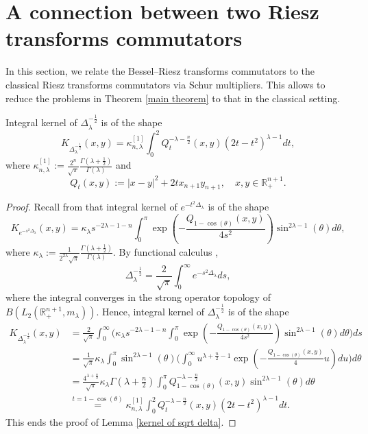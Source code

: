 \documentclass[12pt]{amsart}
\begin{document}
\section{A connection between two Riesz transforms commutators}\label{Sec3}
In this section, we relate the Bessel--Riesz transforms commutators to the classical Riesz transforms commutators via Schur multipliers. This allows to reduce the problems in Theorem \ref{main theorem} to that in the classical setting.
\begin{lemma}\label{kernel of sqrt delta} Integral kernel of $\Delta_{\lambda}^{-\frac12}$ is of the shape
$$K_{\Delta_{\lambda}^{-\frac12}}(x,y)=\kappa_{n,\lambda}^{[1]}\int_0^2Q_t^{-\lambda-\frac{n}{2}}(x,y)(2t-t^2)^{\lambda-1}dt,$$
where $\kappa_{n,\lambda}^{[1]}:=\frac{2^n}{\sqrt{\pi}}\frac{\Gamma(\lambda+\frac{1}{2})}{\Gamma(\lambda)}$ and
$$Q_t(x,y):=|x-y|^2+2tx_{n+1}y_{n+1},\quad x,y\in\mathbb{R}^{n+1}_+.$$
\end{lemma}
\begin{proof} Recall from \cite[formula (2.11)]{FLLXarxiv} that integral kernel of $e^{-t^2\Delta_{\lambda}}$ is of the shape
$$K_{e^{-s^2\Delta_{\lambda}}}(x,y)=\kappa_{\lambda}s^{-2\lambda-1-n}\int_0^{\pi}\exp(-\frac{Q_{1-\cos(\theta)}(x,y)}{4s^2})\sin^{2\lambda-1}(\theta)d\theta,$$
where $\kappa_\lambda:=\frac{1}{2^{2\lambda}\sqrt{\pi}}\frac{\Gamma(\lambda+\frac{1}{2})}{\Gamma(\lambda)}$. By functional calculus \cite{MR1336382},
$$\Delta_{\lambda}^{-\frac12}=\frac{2}{\sqrt{\pi}}\int_0^{\infty}e^{-s^2\Delta_{\lambda}}ds,$$
where the integral converges in the strong operator topology of $B(L_2(\mathbb{R}_+^{n+1},m_\lambda))$.
Hence, integral kernel of $\Delta_{\lambda}^{-\frac12}$ is of the shape
\begin{align*}
K_{\Delta_{\lambda}^{-\frac12}}(x,y)
&=\frac{2}{\sqrt{\pi}}\int_0^{\infty}\Big(\kappa_{\lambda}s^{-2\lambda-1-n}\int_0^{\pi}\exp(-\frac{Q_{1-\cos(\theta)}(x,y)}{4s^2})\sin^{2\lambda-1}(\theta)d\theta\Big)ds\\
&=\frac1{\sqrt{\pi}}\kappa_{\lambda}\int_0^{\pi}\sin^{2\lambda-1}(\theta)\Big(\int_0^{\infty}u^{\lambda+\frac{n}{2}-1}\exp(-\frac{Q_{1-\cos(\theta)}(x,y)}{4}u)du\Big)d\theta\\
&=\frac{4^{\lambda+\frac{n}{2}}}{\sqrt{\pi}}\kappa_{\lambda}\Gamma(\lambda+\frac{n}{2})\int_0^{\pi}Q_{1-\cos(\theta)}^{-\lambda-\frac{n}{2}}(x,y)\sin^{2\lambda-1}(\theta)d\theta\\
&\stackrel{t=1-\cos(\theta)}{=}\kappa_{n,\lambda}^{[1]}\int_0^2Q_t^{-\lambda-\frac{n}{2}}(x,y)(2t-t^2)^{\lambda-1}dt.
\end{align*}
This ends the proof of Lemma \ref{kernel of sqrt delta}.
\end{proof}
\end{document}
